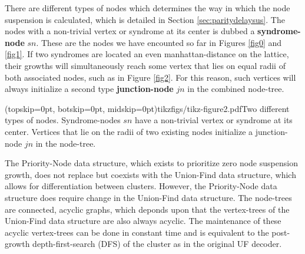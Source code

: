 There are different types of nodes which determines the way in which the node suspension is calculated, which is detailed in Section \ref{sec:paritydelaysus}. The nodes with a non-trivial vertex or syndrome at its center is dubbed a \textbf{syndrome-node} $sn$. These are the nodes we have encounted so far in Figures \ref{fig0} and \ref{fig1}. If two syndromes are located an even manhattan-distance on the lattice, their growths will simultaneously reach some vertex that lies on equal radii of both associated nodes, such as in Figure \ref{fig2}. For this reason, such vertices will always initialize a second type \textbf{junction-node} $jn$ in the combined node-tree.

\Figure[htb](topskip=0pt, botskip=0pt, midskip=0pt){tikzfigs/tikz-figure2.pdf}{Two different types of nodes. Syndrome-nodes $sn$ have a non-trivial vertex or syndrome at its center. Vertices that lie on the radii of two existing nodes initialize a junction-node $jn$ in the node-tree.\label{fig2}}

The Priority-Node data structure, which exists to prioritize zero node suspension growth, does not replace but coexists with the Union-Find data structure, which allows for differentiation between clusters. However, the Priority-Node data structure does require change in the Union-Find data structure. The node-trees are connected, acyclic graphs, which deponds upon that the vertex-trees of the Union-Find data structure are also always acyclic. The maintenance of these acyclic vertex-trees can be done in constant time and is equivalent to the post-growth depth-first-search (DFS) of the cluster as in the original UF decoder. 
